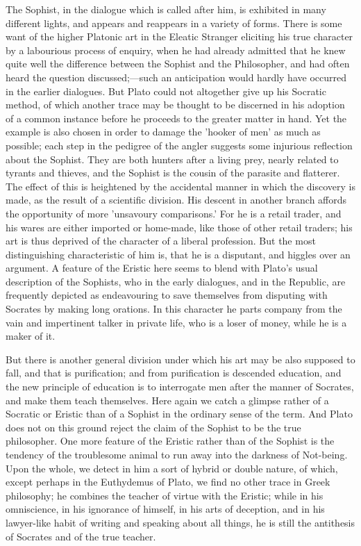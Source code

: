 \documentclass[11pt,letter]{article}
\begin{document}
\par  The Sophist, in the dialogue which is called after him, is exhibited in many different lights, and appears and reappears in a variety of forms. There is some want of the higher Platonic art in the Eleatic Stranger eliciting his true character by a labourious process of enquiry, when he had already admitted that he knew quite well the difference between the Sophist and the Philosopher, and had often heard the question discussed;—such an anticipation would hardly have occurred in the earlier dialogues. But Plato could not altogether give up his Socratic method, of which another trace may be thought to be discerned in his adoption of a common instance before he proceeds to the greater matter in hand. Yet the example is also chosen in order to damage the 'hooker of men' as much as possible; each step in the pedigree of the angler suggests some injurious reflection about the Sophist. They are both hunters after a living prey, nearly related to tyrants and thieves, and the Sophist is the cousin of the parasite and flatterer. The effect of this is heightened by the accidental manner in which the discovery is made, as the result of a scientific division. His descent in another branch affords the opportunity of more 'unsavoury comparisons.' For he is a retail trader, and his wares are either imported or home-made, like those of other retail traders; his art is thus deprived of the character of a liberal profession. But the most distinguishing characteristic of him is, that he is a disputant, and higgles over an argument. A feature of the Eristic here seems to blend with Plato's usual description of the Sophists, who in the early dialogues, and in the Republic, are frequently depicted as endeavouring to save themselves from disputing with Socrates by making long orations. In this character he parts company from the vain and impertinent talker in private life, who is a loser of money, while he is a maker of it.

\par  But there is another general division under which his art may be also supposed to fall, and that is purification; and from purification is descended education, and the new principle of education is to interrogate men after the manner of Socrates, and make them teach themselves. Here again we catch a glimpse rather of a Socratic or Eristic than of a Sophist in the ordinary sense of the term. And Plato does not on this ground reject the claim of the Sophist to be the true philosopher. One more feature of the Eristic rather than of the Sophist is the tendency of the troublesome animal to run away into the darkness of Not-being. Upon the whole, we detect in him a sort of hybrid or double nature, of which, except perhaps in the Euthydemus of Plato, we find no other trace in Greek philosophy; he combines the teacher of virtue with the Eristic; while in his omniscience, in his ignorance of himself, in his arts of deception, and in his lawyer-like habit of writing and speaking about all things, he is still the antithesis of Socrates and of the true teacher.
\end{document}
